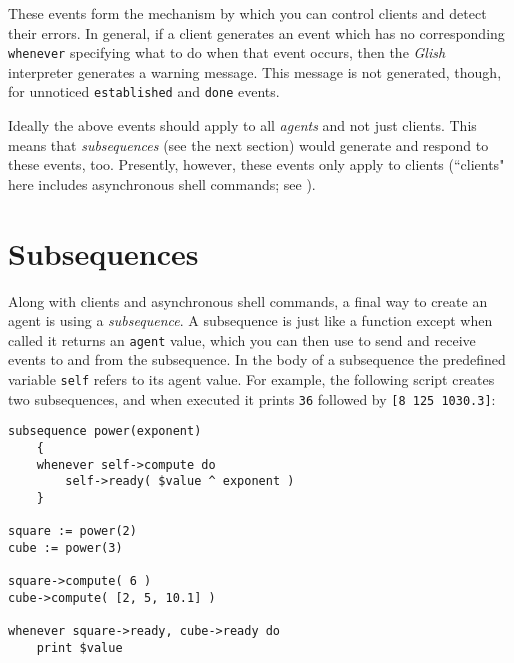 These events form the mechanism by which you can control clients and
detect their errors.  In general, if a client generates an event which 
has no corresponding {\tt whenever} specifying what to do when that
event occurs, then the {\em Glish} interpreter generates a warning message.
This message is not generated, though, for unnoticed {\tt established}
and {\tt done} events.

Ideally the above events should apply to all {\em agents} and
not just clients.  This means that 
{\em subsequences} (see the
next section) would generate and respond to these events, too.  Presently,
however, these events only apply to clients (``clients" here includes
asynchronous shell commands; see ).

\section{Subsequences}
\label{subseq}

Along with clients and asynchronous shell commands, a final way to create
an agent is using a {\em subsequence\/}.  A
subsequence is just like a function except when called it returns
an {\tt agent} value, which you can then use to send and receive events to and
from the subsequence.  In the body of a subsequence the predefined variable
{\tt self} refers to its agent value.  For example, the following script
creates two subsequences, and when executed it prints {\tt 36} followed by
{\tt [8~125~1030.3]}:

\begin{verbatim}
subsequence power(exponent)
    {
    whenever self->compute do
        self->ready( $value ^ exponent )
    }

square := power(2)
cube := power(3)

square->compute( 6 )
cube->compute( [2, 5, 10.1] )

whenever square->ready, cube->ready do
    print $value
\end{verbatim}


